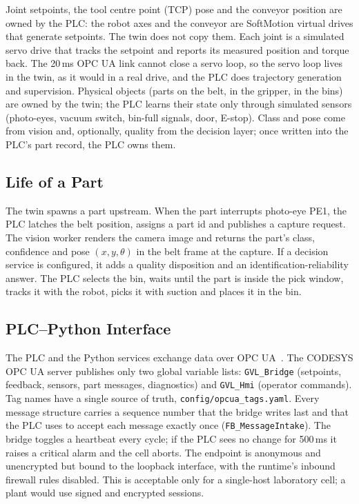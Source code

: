 Joint setpoints, the tool centre point (TCP) pose and the conveyor position are owned by the PLC:
the robot axes and the conveyor are SoftMotion virtual drives that generate setpoints. The twin
does not copy them. Each joint is a simulated servo drive that tracks the setpoint and reports
its measured position and torque back. The 20\,ms OPC UA link cannot close a servo loop, so the
servo loop lives in the twin, as it would in a real drive, and the PLC does trajectory generation
and supervision. Physical objects (parts on the belt, in the gripper, in the bins) are owned by
the twin; the PLC learns their state only through simulated sensors (photo-eyes, vacuum switch,
bin-full signals, door, E-stop). Class and pose come from vision and, optionally, quality from the
decision layer; once written into the PLC's part record, the PLC owns them.

\subsection{Life of a Part}

The twin spawns a part upstream. When the part interrupts photo-eye PE1, the PLC latches the belt
position, assigns a part id and publishes a capture request. The vision worker renders the camera
image and returns the part's class, confidence and pose $(x, y, \theta)$ in the belt frame at the
capture. If a decision service is configured, it adds a quality disposition and an
identification-reliability answer. The PLC selects the bin, waits until the part is inside the
pick window, tracks it with the robot, picks it with suction and places it in the bin.

\subsection{PLC--Python Interface}

The PLC and the Python services exchange data over OPC UA~\cite{IEC62541}. The CODESYS OPC UA
server publishes only two global variable lists: \texttt{GVL\_Bridge} (setpoints, feedback,
sensors, part messages, diagnostics) and \texttt{GVL\_Hmi} (operator commands). Tag names have a
single source of truth, \texttt{config/opcua\_tags.yaml}. Every message structure carries a
sequence number that the bridge writes last and that the PLC uses to accept each message exactly
once (\texttt{FB\_MessageIntake}). The bridge toggles a heartbeat every cycle; if the PLC sees no
change for 500\,ms it raises a critical alarm and the cell aborts. The endpoint is anonymous and
unencrypted but bound to the loopback interface, with the runtime's inbound firewall rules
disabled. This is acceptable only for a single-host laboratory cell; a plant would use signed and
encrypted sessions.
